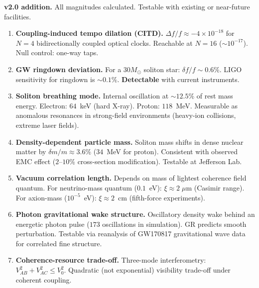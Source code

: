 \documentclass[11pt, a4paper]{article}
\begin{document}
\textbf{v2.0 addition.} All magnitudes calculated. Testable with
existing or near-future facilities.

\begin{enumerate}[label=P\arabic*.]
  \item \textbf{Coupling-induced tempo dilation (CITD).}
        $\Delta f/f \approx -4 \times 10^{-18}$ for $N = 4$
        bidirectionally coupled optical clocks. Reachable at $N = 16$
        ($\sim 10^{-17}$). Null control: one-way taps.

  \item \textbf{GW ringdown deviation.}
        For a $30M_\odot$ soliton star: $\delta f/f \sim 0.6\%$.
        LIGO sensitivity for ringdown is $\sim 0.1\%$.
        \textbf{Detectable} with current instruments.

  \item \textbf{Soliton breathing mode.}
        Internal oscillation at $\sim 12.5\%$ of rest mass energy.
        Electron: $64$~keV (hard X-ray). Proton: $118$~MeV.
        Measurable as anomalous resonances in strong-field
        environments (heavy-ion collisions, extreme laser fields).

  \item \textbf{Density-dependent particle mass.}
        Soliton mass shifts in dense nuclear matter by
        $\delta m/m \approx 3.6\%$ ($34$~MeV for proton).
        Consistent with observed EMC effect ($2$--$10\%$
        cross-section modification). Testable at Jefferson Lab.

  \item \textbf{Vacuum correlation length.}
        Depends on mass of lightest coherence field quantum.
        For neutrino-mass quantum ($0.1$~eV): $\xi \approx 2\;\mu$m
        (Casimir range). For axion-mass ($10^{-5}$~eV):
        $\xi \approx 2$~cm (fifth-force experiments).

  \item \textbf{Photon gravitational wake structure.}
        Oscillatory density wake behind an energetic photon pulse
        ($173$ oscillations in simulation). GR predicts smooth
        perturbation. Testable via reanalysis of GW170817
        gravitational wave data for correlated fine structure.

  \item \textbf{Coherence-resource trade-off.}
        Three-mode interferometry: $V_{AB}^2 + V_{AC}^2 \leq V_0^2$.
        Quadratic (not exponential) visibility trade-off under
        coherent coupling.
\end{enumerate}
\end{document}
